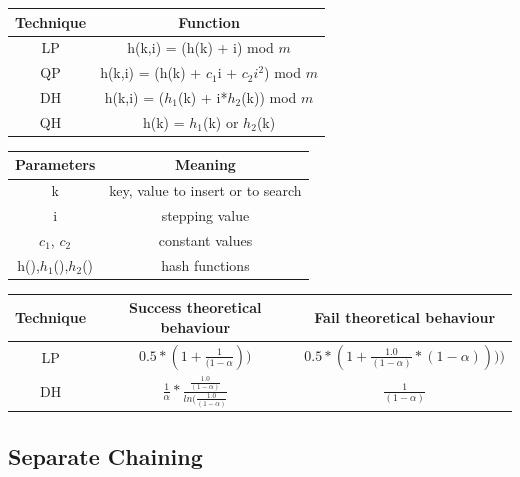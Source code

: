 \documentclass{article}
\begin{document}
\begin{center}
\begin{tabular}{c|c}
    Technique & Function\\
\hline
    LP & h(k,i) = (h(k) + i) mod $m$ \\
\hline
    QP & h(k,i) = (h(k) + $c_1$i + $c_2i^2$) mod $m$ \\
\hline
    DH & h(k,i) = ($h_1$(k) + i*$h_2$(k)) mod $m$ \\
\hline
    QH & h(k) = $h_1$(k) or $h_2$(k) \\
\end{tabular}

\begin{tabular}{c|c}
    Parameters & Meaning \\
\hline
    k & key, value to insert or to search \\
\hline
    i & stepping value \\
\hline
    $c_1$, $c_2$ & constant values \\
\hline
    h(),$h_1$(),$h_2$() & hash functions \\
\end{tabular}
\end{center}

\begin{tabular}{c|c|c}
    Technique & Success theoretical behaviour & Fail theoretical behaviour \\
\hline
    LP &  $0.5 * (1 + \frac{1}{(1 - \alpha}))$ & $0.5 * (1 + \frac{1.0}{(1 - \alpha)} * (1 - \alpha))))$ \\
\hline
    DH & $\frac{1}{\alpha} * \frac{\frac{1.0}{(1 - \alpha)}}{ln(\frac{1.0}{(1-\alpha)}}$ & $\frac{1}{(1 - \alpha)}$ \\
\end{tabular}

    \subsection{Separate Chaining}
    
\end{document}
